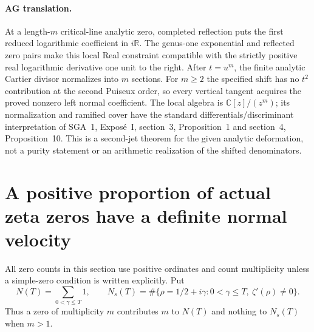 \paragraph{AG translation.}
At a length-$m$ critical-line analytic zero, completed
reflection puts the first reduced logarithmic coefficient
in $i\mathbb R$. The genus-one exponential and reflected
zero pairs make this local Real constraint compatible with
the strictly positive real logarithmic derivative one unit
to the right. After $t=u^m$, the finite analytic Cartier
divisor normalizes into $m$ sections. For $m\ge2$ the
specified shift has no $t^2$ contribution at the second
Puiseux order, so every vertical tangent acquires the
proved nonzero left normal coefficient. The local algebra
is $\mathbb C[z]/(z^m)$; its normalization and ramified
cover have the standard differentials/discriminant
interpretation of SGA~1, Expos\'e~I, section~3,
Proposition~1 and section~4, Proposition~10. This is a
second-jet theorem for the given analytic deformation,
not a purity statement or an arithmetic realization of
the shifted denominators.


\section{A positive proportion of actual zeta zeros have a definite normal velocity}
\label{sec:analytic-arithmetic-transverse-proportion}

All zero counts in this section use positive ordinates and
count multiplicity unless a simple-zero condition is written
explicitly. Put
\[
 N(T)=\sum_{0<\gamma\le T}1,\qquad
 N_s(T)=\#\{\rho=1/2+i\gamma:0<\gamma\le T,
                                      \ \zeta'(\rho)\ne0\}.
\]
Thus a zero of multiplicity $m$ contributes $m$ to $N(T)$ and
nothing to $N_s(T)$ when $m>1$.

